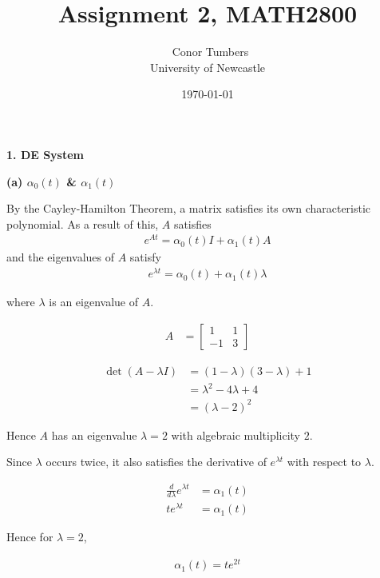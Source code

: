 \documentclass[a4paper,11pt]{article}
\begin{document}
\title{Assignment 2, MATH2800}
\author{
\ Conor Tumbers 
\\ {\small University of Newcastle}
}

\date{\today}

\maketitle

\textbf{1. DE System}

\textbf{(a) $\alpha_0(t)$ \& $\alpha_1(t)$}

By the Cayley-Hamilton Theorem, a matrix satisfies its own characteristic polynomial. As a result of this, $A$ satisfies
\begin{align*}
e^{At} = \alpha_0(t)I + \alpha_1(t)A
\end{align*}
and the eigenvalues of $A$ satisfy 
\begin{align*}
e^{\lambda t} = \alpha_0(t) + \alpha_1(t)\lambda
\end{align*}

where $\lambda$ is an eigenvalue of $A$.

\begin{align*}
A &= \begin{bmatrix}
1 & 1 \\
-1 & 3
\end{bmatrix}
\end{align*}

\begin{align*}
\det(A - \lambda I) &= (1 - \lambda)(3 - \lambda) + 1\\
&= \lambda^2 - 4 \lambda + 4\\
&= (\lambda - 2)^2
\end{align*}

Hence $A$ has an eigenvalue $\lambda = 2$ with algebraic multiplicity $2$.

Since $\lambda$ occurs twice, it also satisfies the derivative of $e^{\lambda t}$ with respect to $\lambda$.

\begin{align*}
\frac{d}{d\lambda}e^{\lambda t} &= \alpha_1(t)\\
te^{\lambda t} &= \alpha_1(t)
\end{align*}

Hence for $\lambda = 2$,

\begin{align*}
\alpha_1(t) = te^{2t}
\end{align*}
\end{document}
